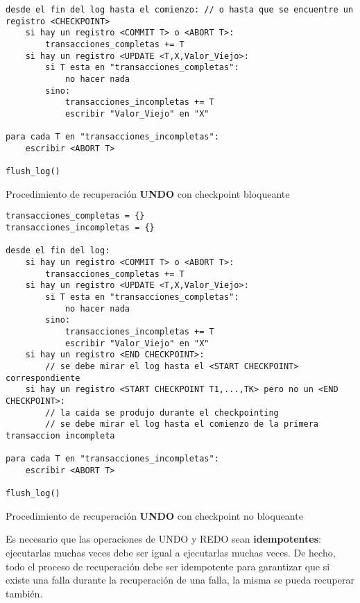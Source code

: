 \documentclass[a4paper, twoside]{article}
\begin{document}
\begin{itemize}
\begin{itemize}
\begin{enumerate}
\begin{algorithm}[H]
\begin{lstlisting}
desde el fin del log hasta el comienzo: // o hasta que se encuentre un registro <CHECKPOINT>
	si hay un registro <COMMIT T> o <ABORT T>:
		transacciones_completas += T
	si hay un registro <UPDATE <T,X,Valor_Viejo>:
		si T esta en "transacciones_completas":
			no hacer nada
		sino:
			transacciones_incompletas += T
			escribir "Valor_Viejo" en "X"

para cada T en "transacciones_incompletas":
	escribir <ABORT T>

flush_log()
\end{lstlisting}


\protect\caption{Procedimiento de recuperación \textbf{UNDO }con checkpoint bloqueante}
\end{algorithm}



\begin{algorithm}[H]
\begin{lstlisting}
transacciones_completas = {}
transacciones_incompletas = {}

desde el fin del log: 
	si hay un registro <COMMIT T> o <ABORT T>:
		transacciones_completas += T
	si hay un registro <UPDATE <T,X,Valor_Viejo>:
		si T esta en "transacciones_completas":
			no hacer nada
		sino:
			transacciones_incompletas += T
			escribir "Valor_Viejo" en "X"
	si hay un registro <END CHECKPOINT>:
		// se debe mirar el log hasta el <START CHECKPOINT> correspondiente
	si hay un registro <START CHECKPOINT T1,...,TK> pero no un <END CHECKPOINT>:
		// la caida se produjo durante el checkpointing
		// se debe mirar el log hasta el comienzo de la primera transaccion incompleta

para cada T en "transacciones_incompletas":
	escribir <ABORT T>

flush_log()
\end{lstlisting}


\protect\caption{Procedimiento de recuperación \textbf{UNDO }con checkpoint no bloqueante}
\end{algorithm}


\end{enumerate}
\end{itemize}
\end{itemize}
Es necesario que las operaciones de UNDO y REDO sean \textbf{idempotentes}:
ejecutarlas muchas veces debe ser igual a ejecutarlas muchas veces.
De hecho, todo el proceso de recuperación debe ser idempotente para
garantizar que si existe una falla durante la recuperación de una
falla, la misma se pueda recuperar también.
\end{document}
